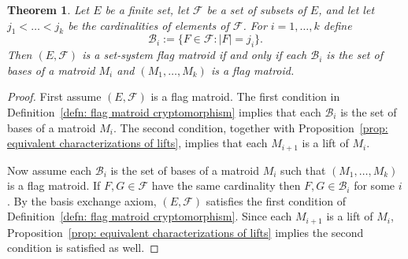 \documentclass[12pt]{article}
\newtheorem{theorem}[thm]{Theorem}
\theoremstyle{definition}
\begin{document}
\begin{theorem}\label{thm: flag matroid cryptomorphism}
    Let $E$ be a finite set, let $\mathcal{F}$ be a set of subsets of $E$, and let
    let $j_1 < \dots < j_k$ be the cardinalities of elements of $\mathcal{F}$.
    For $i = 1,\dots,k$ define
    \[
        \mathcal{B}_i := \{F \in \mathcal{F} : |F| = j_i\}.
    \]
    Then $(E,\mathcal{F})$ is a set-system flag matroid if and only if each $\mathcal{B}_i$ is the set of bases of a matroid $M_i$
    and $(M_1,\dots,M_k)$ is a flag matroid.
\end{theorem}
\begin{proof}
    First assume $(E,\mathcal{F})$ is a flag matroid.
    The first condition in Definition~\ref{defn: flag matroid cryptomorphism} implies that each $\mathcal{B}_i$
    is the set of bases of a matroid $M_i$.
    The second condition, together with Proposition~\ref{prop: equivalent characterizations of lifts},
    implies that each $M_{i+1}$ is a lift of $M_i$.

    Now assume each $\mathcal{B}_i$ is the set of bases of a matroid $M_i$ such that $(M_1,\dots,M_k)$ is a flag matroid.
    If $F,G \in \mathcal{F}$ have the same cardinality then $F,G \in \mathcal{B}_i$ for some $i$.
    By the basis exchange axiom, $(E,\mathcal{F})$ satisfies the first condition of Definition~\ref{defn: flag matroid cryptomorphism}.
    Since each $M_{i+1}$ is a lift of $M_i$, Proposition~\ref{prop: equivalent characterizations of lifts} implies the second condition is satisfied as well.
\end{proof}

    
\end{document}
